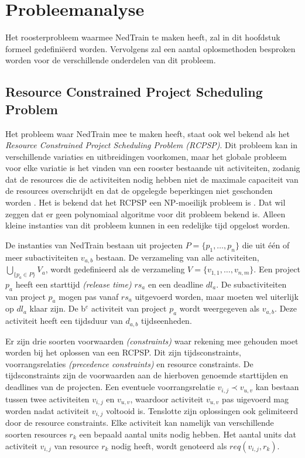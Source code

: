\section{Probleemanalyse}
\label{sec:probleemanalyse}

Het roosterprobleem waarmee NedTrain te maken heeft, zal in dit hoofdstuk formeel gedefini\"eerd worden. Vervolgens zal een aantal oplosmethoden besproken worden voor de verschillende onderdelen van dit probleem.

\subsection{Resource Constrained Project Scheduling Problem}
Het probleem waar NedTrain mee te maken heeft, staat ook wel bekend als het \emph{Resource Constrained Project Scheduling Problem (RCPSP)}. Dit probleem kan in verschillende variaties en uitbreidingen voorkomen, maar het globale probleem voor elke variatie is het vinden van een rooster bestaande uit activiteiten, zodanig dat de resources die de activiteiten nodig hebben niet de maximale capaciteit van de resources overschrijdt en dat de opgelegde beperkingen niet geschonden worden \cite{lombardi2010constraint}. Het is bekend dat het RCPSP een NP-moeilijk probleem is \cite{blazewicz1983scheduling}. Dat wil zeggen dat er geen polynomiaal algoritme voor dit probleem bekend is. Alleen kleine instanties van dit probleem kunnen in een redelijke tijd opgelost worden. 

De instanties van NedTrain bestaan uit projecten $P = \{p_1, \dots , p_n\}$ die uit \'e\'en of meer subactiviteiten $v_{a,b}$ bestaan. De verzameling van alle activiteiten, $\bigcup_{\{p_a \in P\}} V_a$, wordt gedefinieerd als de verzameling $V = \{v_{1,1}, \dots , v_{n,m}\}$. Een project $p_a$ heeft een starttijd \emph{(release time)} $rs_a$ en een deadline $dl_a$. De subactiviteiten van project $p_a$ mogen pas vanaf $rs_a$ uitgevoerd worden, maar moeten wel uiterlijk op $dl_a$ klaar zijn. De b$^e$ activiteit van project $p_a$ wordt weergegeven als $v_{a,b}$. Deze activiteit heeft een tijdsduur van $d_{a,b}$ tijdseenheden.

Er zijn drie soorten voorwaarden \emph{(constraints)} waar rekening mee gehouden moet worden bij het oplossen van een RCPSP. Dit zijn tijdsconstraints, voorrangsrelaties \emph{(precedence constraints)} en resource constraints. De tijdsconstraints zijn de voorwaarden aan de hierboven genoemde starttijden en deadlines van de projecten. Een eventuele voorrangsrelatie $v_{i,j} \prec v_{u,v}$ kan bestaan tussen twee activiteiten $v_{i,j}$ en $v_{u,v}$, waardoor activiteit $v_{u,v}$ pas uigevoerd mag worden nadat activiteit $v_{i,j}$ voltooid is. Tenslotte zijn oplossingen ook gelimiteerd door de resource constraints. Elke activiteit kan namelijk van verschillende soorten resources $r_k$ een bepaald aantal units nodig hebben. Het aantal units dat activiteit $v_{i,j}$ van resource $r_k$ nodig heeft, wordt genoteerd als $req(v_{i,j},r_k)$.

